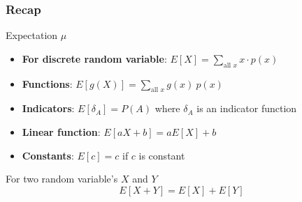 \documentclass[slidestop,compress,mathserif]{beamer}
\begin{document}
\begin{frame}\frametitle{Recap}

Expectation $\mu$
\begin{itemize}
\item \textbf{For discrete random variable}: $E[X] = \sum_{\text{all } x} x \cdot p(x)$
\item \textbf{Functions}: $E[g(X)] = \sum_{\text{all }x} g(x)~p(x)$
\vspace{2mm}
\item \textbf{Indicators}: $E[\delta_A] = P(A)$ where $\delta_A$ is an indicator function
\item \textbf{Linear function}: $E[aX + b] = aE[X] + b$
\item \textbf{Constants}: $E[c] = c$ if $c$ is constant
\end{itemize}

For two random variable's $X$ and $Y$
\[E[X + Y] = E[X] + E[Y]\]

\end{frame}


\end{document}
